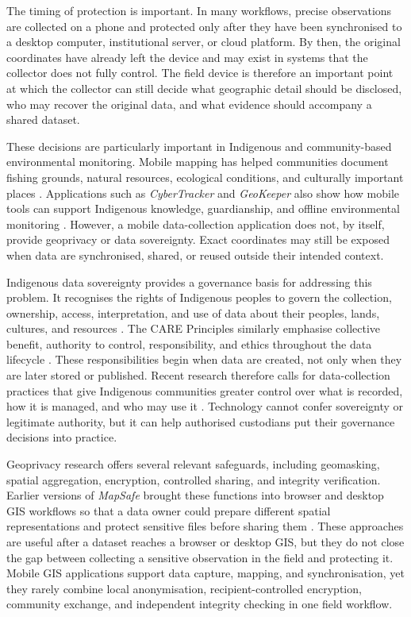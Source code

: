 \documentclass[]{interact}
\begin{document}
The timing of protection is important. In many workflows, precise observations are collected on a phone and protected only after they have been synchronised to a desktop computer, institutional server, or cloud platform. By then, the original coordinates have already left the device and may exist in systems that the collector does not fully control. The field device is therefore an important point at which the collector can still decide what geographic detail should be disclosed, who may recover the original data, and what evidence should accompany a shared dataset.

These decisions are particularly important in Indigenous and community-based environmental monitoring. Mobile mapping has helped communities document fishing grounds, natural resources, ecological conditions, and culturally important places \citep{paul2016piloting}. Applications such as \textit{CyberTracker} and \textit{GeoKeeper} also show how mobile tools can support Indigenous knowledge, guardianship, and offline environmental monitoring \citep{ens2012cybertracker,kwusen2024geokeeper}. However, a mobile data-collection application does not, by itself, provide geoprivacy or data sovereignty. Exact coordinates may still be exposed when data are synchronised, shared, or reused outside their intended context.

Indigenous data sovereignty provides a governance basis for addressing this problem. It recognises the rights of Indigenous peoples to govern the collection, ownership, access, interpretation, and use of data about their peoples, lands, cultures, and resources \citep{kukutai2016indigenous}. The CARE Principles similarly emphasise collective benefit, authority to control, responsibility, and ethics throughout the data lifecycle \citep{carroll2020care}. These responsibilities begin when data are created, not only when they are later stored or published. Recent research therefore calls for data-collection practices that give Indigenous communities greater control over what is recorded, how it is managed, and who may use it \citep{marriott2025indigenous,engstrom2024indigenous}. Technology cannot confer sovereignty or legitimate authority, but it can help authorised custodians put their governance decisions into practice.

Geoprivacy research offers several relevant safeguards, including geomasking, spatial aggregation, encryption, controlled sharing, and integrity verification. Earlier versions of \textit{MapSafe} brought these functions into browser and desktop GIS workflows so that a data owner could prepare different spatial representations and protect sensitive files before sharing them \citep{sharma2023mapsafe,sharma2024indigenous,sharma2025mapsafe}. These approaches are useful after a dataset reaches a browser or desktop GIS, but they do not close the gap between collecting a sensitive observation in the field and protecting it. Mobile GIS applications support data capture, mapping, and synchronisation, yet they rarely combine local anonymisation, recipient-controlled encryption, community exchange, and independent integrity checking in one field workflow.
\end{document}
